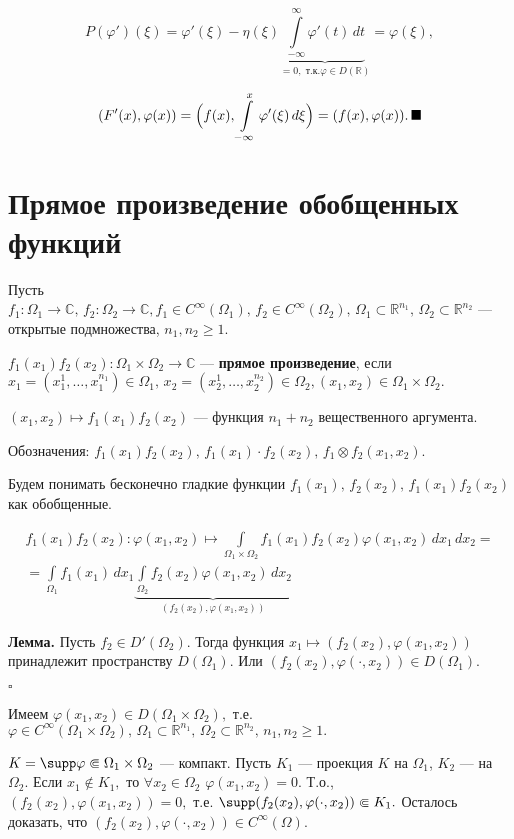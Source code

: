 \documentclass[unicode,12pt,draft]{article}
\begin{document}
$$P(\varphi')(\xi)=\varphi'(\xi)-\eta(\xi)\underbrace{\int\limits_{-\infty}^{\infty}\varphi'(t)\,dt}_{=0,\mbox{ т.к.} \varphi\in D(\mathbb R)}=\varphi(\xi),$$

$$(F'(x),\varphi(x))=\Bigl(f(x),\int\limits_{-\infty}^x
\varphi'(\xi)\,d\xi\Bigr)=(f(x),\varphi(x)).\,\blacksquare$$

\section{Прямое произведение обобщенных функций}

Пусть $f_1\colon \Omega_1\to \mathbb C,\,f_2\colon \Omega_2\to
\mathbb C, f_1\in C^{\infty}(\Omega_1),\,f_2\in
C^{\infty}(\Omega_2),\,\Omega_1\subset\mathbb
R^{n_1},\,\Omega_2\subset\mathbb R^{n_2}$ --- открытые
подмножества, $n_1,n_2\ge1.$

$f_1(x_1)f_2(x_2)\colon \Omega_1\times\Omega_2\to \mathbb C$ ---
\textbf{прямое произведение}, если
$x_1=(x_1^1,\ldots,x_1^{n_1})\in\Omega_1,\,x_2=(x_2^1,\ldots,x_2^{n_2})\in\Omega_2,
(x_1,x_2)\in \Omega_1\times\Omega_2.$

$(x_1,x_2)\mapsto f_1(x_1)f_2(x_2)$ --- функция $n_1+n_2$
вещественного аргумента.

Обозначения: $f_1(x_1)f_2(x_2),\,f_1(x_1)\cdot
f_2(x_2),\,f_1\otimes f_2(x_1,x_2).$

Будем понимать бесконечно гладкие функции
$f_1(x_1),\,f_2(x_2),\,f_1(x_1)f_2(x_2)$ как обобщенные.

\begin{multline}
f_1(x_1)f_2(x_2)\colon \varphi(x_1,x_2)\mapsto
\int\limits_{\Omega_1\times\Omega_2}f_1(x_1)f_2(x_2)\varphi(x_1,x_2)\,dx_1\,dx_2=\\=
\int\limits_{\Omega_1}f_1(x_1)\,dx_1
\underbrace{\int\limits_{\Omega_2}f_2(x_2)\varphi(x_1,x_2)\,dx_2}_{(f_2(x_2),\varphi(x_1,x_2))}
\end{multline}

\textbf{Лемма.} Пусть $f_2\in D'(\Omega_2).$ Тогда функция
$x_1\mapsto (f_2(x_2),\varphi(x_1,x_2))$ принадлежит пространству
$D(\Omega_1).$ Или $(f_2(x_2),\varphi(\cdot,x_2))\in D(\Omega_1).$

$\square$

Имеем $\varphi(x_1,x_2) \in D(\Omega_1\times\Omega_2),$ т.е.
$\varphi\in  C^{\infty}(\Omega_1\times\Omega_2),\,
\Omega_1\subset\mathbb R^{n_1},\,\Omega_2\subset\mathbb
R^{n_2},\,n_1,n_2\ge1.$

$K=\supp \varphi\Subset\Omega_1\times\Omega_2$ --- компакт. Пусть
$K_1$ --- проекция $K$ на $\Omega_1$, $K_2$ --- на $\Omega_2$.
Если $x_1\notin K_1,$ то $\forall
x_2\in\Omega_2\,\,\varphi(x_1,x_2)=0.$ Т.о.,
$(f_2(x_2),\varphi(x_1,x_2))=0,$ т.е. $\supp
(f_2(x_2),\varphi(\cdot,x_2))\Subset K_1.$ Осталось доказать, что
$(f_2(x_2),\varphi(\cdot,x_2))\in C^{\infty}(\Omega).$
\end{document}
